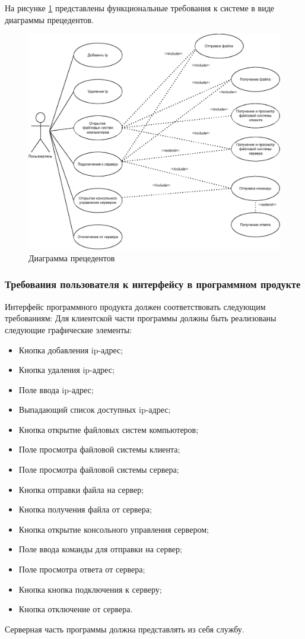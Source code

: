 На рисунке \ref{fig:-use_case_diagram} представлены функциональные требования к системе в виде диаграммы прецедентов.
\begin{figure}
	\centering
	\includegraphics[width=1\linewidth]{"images/Диаграмма прецедентов"}
	\caption{Диаграмма прецедентов}
	\label{fig:-use_case_diagram}
\end{figure}

\subsubsection{Требования пользователя к интерфейсу в программном продукте}
Интерфейс программного продукта должен соответствовать следующим требованиям:
Для клиентской части программы должны быть реализованы следующие графические элементы:
\begin{itemize}
	\item Кнопка добавления ip-адрес;
	\item Кнопка удаления ip-адрес;
	\item Поле ввода ip-адрес;
	\item Выпадающий список доступных ip-адрес;
	\item Кнопка открытие файловых систем компьютеров;
	\item Поле просмотра файловой системы клиента;
	\item Поле просмотра файловой системы сервера;
	\item Кнопка отправки файла на сервер;
	\item Кнопка получения файла от сервера;
	\item Кнопка открытие консольного управления сервером;
	\item Поле ввода команды для отправки на сервер;
	\item Поле просмотра ответа от сервера;
	\item Кнопка кнопка подключения к серверу;
	\item Кнопка отключение от сервера.
\end{itemize}
Серверная часть программы должна представлять из себя службу.

